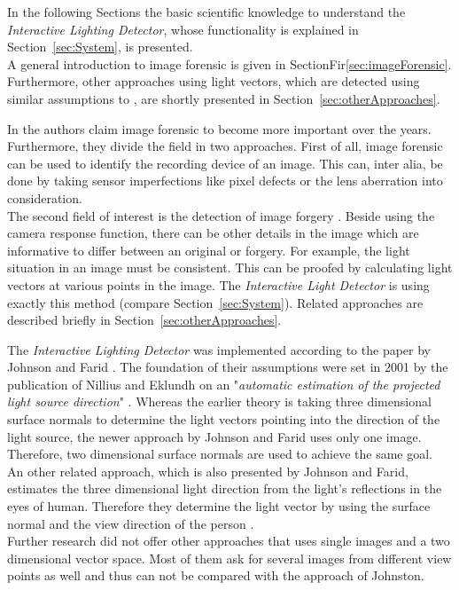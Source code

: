  \label{sec:StateOfTheArt}
In the following Sections the basic scientific knowledge to understand the \textit{Interactive Lighting Detector}, whose functionality is explained in Section~\ref{sec:System}, is presented.\\
A general introduction to image forensic is given in SectionFir\ref{sec:imageForensic}.
Furthermore, other approaches using light vectors, which are detected using similar assumptions to \cite{Johnson}, are shortly presented in Section~\ref{sec:otherApproaches}.


\label{sec:imageForensic}

In \cite{4284575} the authors claim image forensic to become more important over the years. Furthermore, they divide the field in two approaches. First of all, image forensic can be used to identify the recording device of an image. This can, inter alia, be done by taking sensor imperfections like pixel defects or the lens aberration into consideration. \\
The second field of interest is the detection of image forgery \cite{4806202}. Beside using the camera response function, there can be other details in the image which are informative to differ between an original or forgery. For example, the light situation in an image must be consistent. This can be proofed by calculating light vectors at various points in the image. The \textit{Interactive Light Detector} is using exactly this method (compare Section~\ref{sec:System}). Related approaches are described briefly in Section~\ref{sec:otherApproaches}.


 \label{sec:otherApproaches}
The \textit{Interactive Lighting Detector} was implemented according to the paper by Johnson and Farid \cite{Johnson}. The foundation of their assumptions were set in 2001 by the publication of Nillius and Eklundh on an "\textit{automatic estimation of the projected light source direction}" \cite{990650}. Whereas the earlier theory is taking three dimensional surface normals to determine the light vectors pointing into the direction of the light source, the newer approach by Johnson and Farid uses only one image. Therefore, two dimensional surface normals are used to achieve the same goal. \\
An other related approach, which is also presented by Johnson and Farid, estimates the three dimensional light direction from the light's reflections in the eyes of human. Therefore they determine the light vector by using the surface normal and the view direction of the person \cite{johnson06specular}.
\\ Further research did not offer other approaches that uses single images and a two dimensional vector space. Most of them ask for several images from different view points as well and thus can not be compared with the approach of Johnston.

\newpage
